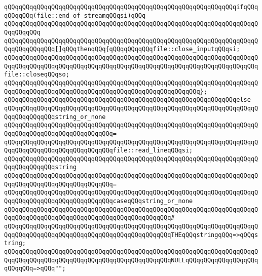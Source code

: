 \verb|qQQqqQQqqQQqqQQqqQQqqQQqqQQqqQQqqQQqqQQqqQQqqQQqqQQqqQQqqQQqqQQqifqQQqqQQqqQQq(file::end_of_streamqQQqsi)qQQq|\newline
\verb|qQQqqQQqqQQqqQQqqQQqqQQqqQQqqQQqqQQqqQQqqQQqqQQqqQQqqQQqqQQqqQQqqQQqqQQqqQQqqQQq|\newline
\verb|qQQqqQQqqQQqqQQqqQQqqQQqqQQqqQQqqQQqqQQqqQQqqQQqqQQqqQQqqQQqqQQqqQQqqQQqqQQqqQQqqQQq[]qQQqthenqQQq{qQQqqQQqqQQqfile::close_inputqQQqsi;|\newline
\verb|qQQqqQQqqQQqqQQqqQQqqQQqqQQqqQQqqQQqqQQqqQQqqQQqqQQqqQQqqQQqqQQqqQQqqQQqqQQqqQQqqQQqqQQqqQQqqQQqqQQqqQQqqQQqqQQqqQQqqQQqqQQqqQQqqQQqqQQqqQQqfile::closeqQQqso;|\newline
\verb|qQQqqQQqqQQqqQQqqQQqqQQqqQQqqQQqqQQqqQQqqQQqqQQqqQQqqQQqqQQqqQQqqQQqqQQqqQQqqQQqqQQqqQQqqQQqqQQqqQQqqQQqqQQqqQQqqQQqqQQqqQQq};|\newline
\verb|qQQqqQQqqQQqqQQqqQQqqQQqqQQqqQQqqQQqqQQqqQQqqQQqqQQqqQQqqQQqqQQqelse|\newline
\verb|qQQqqQQqqQQqqQQqqQQqqQQqqQQqqQQqqQQqqQQqqQQqqQQqqQQqqQQqqQQqqQQqqQQqqQQqqQQqqQQqqQQqstring_or_none|\newline
\verb|qQQqqQQqqQQqqQQqqQQqqQQqqQQqqQQqqQQqqQQqqQQqqQQqqQQqqQQqqQQqqQQqqQQqqQQqqQQqqQQqqQQqqQQqqQQqqQQqqQQq=|\newline
\verb|qQQqqQQqqQQqqQQqqQQqqQQqqQQqqQQqqQQqqQQqqQQqqQQqqQQqqQQqqQQqqQQqqQQqqQQqqQQqqQQqqQQqqQQqqQQqqQQqqQQqfile::read_lineqQQqsi;|\newline
\newline
\verb|qQQqqQQqqQQqqQQqqQQqqQQqqQQqqQQqqQQqqQQqqQQqqQQqqQQqqQQqqQQqqQQqqQQqqQQqqQQqqQQqqQQqstring|\newline
\verb|qQQqqQQqqQQqqQQqqQQqqQQqqQQqqQQqqQQqqQQqqQQqqQQqqQQqqQQqqQQqqQQqqQQqqQQqqQQqqQQqqQQqqQQqqQQqqQQqqQQq=|\newline
\verb|qQQqqQQqqQQqqQQqqQQqqQQqqQQqqQQqqQQqqQQqqQQqqQQqqQQqqQQqqQQqqQQqqQQqqQQqqQQqqQQqqQQqqQQqqQQqqQQqqQQqcaseqQQqstring_or_none|\newline
\verb|qQQqqQQqqQQqqQQqqQQqqQQqqQQqqQQqqQQqqQQqqQQqqQQqqQQqqQQqqQQqqQQqqQQqqQQqqQQqqQQqqQQqqQQqqQQqqQQqqQQqqQQqqQQqqQQqqQQq#|\newline
\verb|qQQqqQQqqQQqqQQqqQQqqQQqqQQqqQQqqQQqqQQqqQQqqQQqqQQqqQQqqQQqqQQqqQQqqQQqqQQqqQQqqQQqqQQqqQQqqQQqqQQqqQQqqQQqqQQqqQQqTHEqQQqstringqQQq=>qQQqstring;|\newline
\verb|qQQqqQQqqQQqqQQqqQQqqQQqqQQqqQQqqQQqqQQqqQQqqQQqqQQqqQQqqQQqqQQqqQQqqQQqqQQqqQQqqQQqqQQqqQQqqQQqqQQqqQQqqQQqqQQqqQQqNULLqQQqqQQqqQQqqQQqqQQqqQQqqQQq=>qQQq"";|\newline
